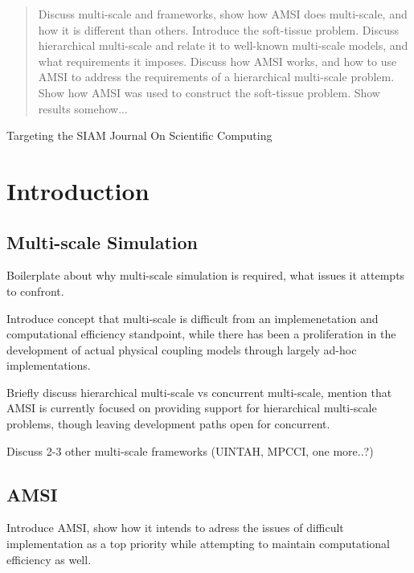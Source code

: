 \documentclass[review]{siamart1116}
\begin{document}
\maketitle

\begin{abstract}
Discuss multi-scale and frameworks, show how AMSI does multi-scale, and how it is different than others. Introduce the soft-tissue problem. Discuss hierarchical multi-scale and relate it to well-known multi-scale models, and what requirements it imposes. Discuss how AMSI works, and how to use AMSI to address the requirements of a hierarchical multi-scale problem. Show how AMSI was used to construct the soft-tissue problem. Show results somehow...

\end{abstract}

Targeting the SIAM Journal On Scientific Computing

\section{Introduction}\label{sec:intro}

\subsection{Multi-scale Simulation}\label{sec:multiscale}

Boilerplate about why multi-scale simulation is required, what issues it attempts to confront.

Introduce concept that multi-scale is difficult from an implemenetation and computational efficiency standpoint, while there has been a proliferation in the development of actual physical coupling models through largely ad-hoc implementations.

Briefly discuss hierarchical multi-scale vs concurrent multi-scale, mention that AMSI is currently focused on providing support for hierarchical multi-scale problems, though leaving development paths open for concurrent.

Discuss 2-3 other multi-scale frameworks (UINTAH, MPCCI, one more..?)

\subsection{AMSI}\label{sec:amsi}

Introduce AMSI, show how it intends to adress the issues of difficult implementation as a top priority while attempting to maintain computational efficiency as well.
\end{document}
